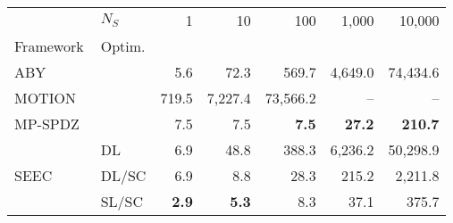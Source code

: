 \begin{tabular}{llrrrrr}
\toprule
 & $N_S$ & 1 & 10 & 100 & 1,000 & 10,000 \\
Framework & Optim. &  &  &  &  &  \\
\midrule
ABY~\cite{DSZ15} &  & 5.6 & 72.3 & 569.7 & 4,649.0 & 74,434.6 \\
\cline{1-7}
MOTION~\cite{BDST22} &  & 719.5 & 7,227.4 & 73,566.2 & -- & -- \\
\cline{1-7}
MP-SPDZ~\cite{CCS:Keller20} &  & 7.5 & 7.5 & \bfseries 7.5 & \bfseries 27.2 & \bfseries 210.7 \\
\cline{1-7}
\multirow[c]{3}{*}{SEEC} & DL & 6.9 & 48.8 & 388.3 & 6,236.2 & 50,298.9 \\
 & DL/SC & 6.9 & 8.8 & 28.3 & 215.2 & 2,211.8 \\
 & SL/SC & \bfseries 2.9 & \bfseries 5.3 & 8.3 & 37.1 & 375.7 \\
\bottomrule
\end{tabular}
